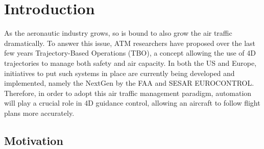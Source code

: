 
\chapter{Introduction}
\label{chapter:introduction}

As the aeronautic industry grows, so is bound to also grow the air traffic dramatically. To answer this issue, ATM researchers have proposed over the last few years Trajectory-Based Operations (TBO), a concept allowing the use of 4D trajectories to manage both safety and air capacity. In both the US and Europe, initiatives to put such systems in place are currently being developed and implemented, namely the NextGen by the FAA and SESAR EUROCONTROL. Therefore, in order to adopt this air traffic management paradigm, automation will play a crucial role in 4D guidance control, allowing an aircraft to follow flight plans more accurately.

\section{Motivation}
\label{section:motivation}

